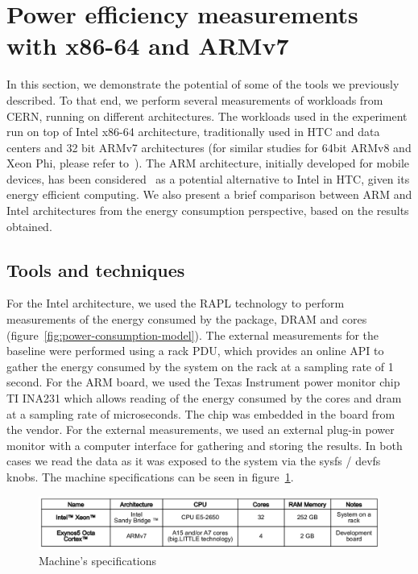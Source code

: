 \documentclass[a4paper]{jpconf}
\begin{document}
\section{Power efficiency measurements with x86-64 and ARMv7}

In this section, we demonstrate the potential of some of the
tools we previously described. To that end, we perform
several measurements of workloads from CERN, running on different
architectures. The workloads used in the experiment run on top of
Intel x86-64 architecture, traditionally used in HTC and data centers
and 32 bit ARMv7 architectures (for similar studies for 64bit ARMv8
and Xeon Phi, please refer to~\cite{ABD2014}). The ARM architecture,
initially developed for mobile devices, has been
considered~\cite{ACAT13ARM, CHEP13ARMPHI} as a potential alternative
to Intel in HTC, given its energy efficient computing. We also
present a brief comparison between ARM and Intel architectures from
the energy consumption perspective, based on the results obtained.

\subsection{Tools and techniques}

For the Intel architecture, we used the RAPL technology to perform measurements
of the energy consumed by the package, DRAM and cores 
(figure~\ref{fig:power-consumption-model}).
The external measurements for the baseline were performed using a
rack PDU, which provides an online API to gather the energy consumed
by the system on the rack at a sampling rate of 1 second.
For the ARM board, we used the Texas Instrument power monitor
chip TI INA231 which allows reading of the energy consumed by the
cores and dram at a sampling rate of microseconds. The chip was
embedded in the board from the vendor. For the external measurements,
we used an external plug-in power monitor with a computer interface
for gathering and storing the results.
In both cases we read the data as it was exposed to the system via
the sysfs / devfs knobs.
The machine specifications can be seen in figure~\ref{figure:machine-specs}.


\begin{figure}[ht!]
\centering
\includegraphics[width=150mm]{img/table.png}
\caption{Machine's specifications}
\label{figure:machine-specs}
\end{figure}
\end{document}
